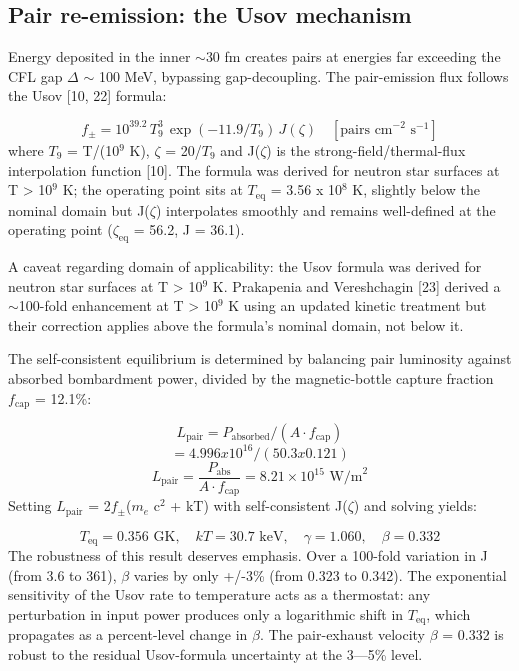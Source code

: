\documentclass[12pt,a4paper]{article}
\begin{document}
\subsection{Pair re-emission: the Usov mechanism}
Energy deposited in the inner $\sim$30 fm creates pairs at energies far exceeding the CFL gap $\Delta$ $\sim$ 100 MeV, bypassing gap-decoupling. The pair-emission flux follows the Usov [10, 22] formula:

\begin{equation}
f_{\pm} = 10^{39.2} \, T_9^3 \, \exp(-11.9/T_9) \, J(\zeta) \quad [\text{pairs cm}^{-2} \text{ s}^{-1}]
\end{equation}
where $T_9$ = T/(10$^{9}$ K), $\zeta$ = 20/$T_9$ and J($\zeta$) is the strong-field/thermal-flux interpolation function [10]. The formula was derived for neutron star surfaces at T > 10$^{9}$ K; the operating point sits at $T_{\text{eq}}$ = 3.56 x 10$^{8}$ K, slightly below the nominal domain but J($\zeta$) interpolates smoothly and remains well-defined at the operating point ($\zeta_{\text{eq}}$ = 56.2, J = 36.1).

A caveat regarding domain of applicability: the Usov formula was derived for neutron star surfaces at T > 10$^{9}$ K. Prakapenia and Vereshchagin [23] derived a $\sim$100-fold enhancement at T > 10$^{9}$ K using an updated kinetic treatment but their correction applies above the formula's nominal domain, not below it.

The self-consistent equilibrium is determined by balancing pair luminosity against absorbed bombardment power, divided by the magnetic-bottle capture fraction $f_{\text{cap}}$ = 12.1\%:

\[
L_{\text{pair}} = P_{\text{absorbed}}/(A \cdot f_{\text{cap}})
\]
\[
= 4.996 x 10^{16}/(50.3 x 0.121)
\]
\begin{equation}
L_\text{pair} = \frac{P_\text{abs}}{A \cdot f_\text{cap}} = 8.21 \times 10^{15} \text{ W/m}^2
\end{equation}
Setting $L_{\text{pair}}$ = 2$f_{±}$($m_e$ c$^{2}$ + kT) with self-consistent J($\zeta$) and solving yields:

\begin{equation}
T_\text{eq} = 0.356 \text{ GK}, \quad kT = 30.7 \text{ keV}, \quad \gamma = 1.060, \quad \beta = 0.332
\end{equation}
The robustness of this result deserves emphasis. Over a 100-fold variation in J (from 3.6 to 361), $\beta$ varies by only +/-3\% (from 0.323 to 0.342). The exponential sensitivity of the Usov rate to temperature acts as a thermostat: any perturbation in input power produces only a logarithmic shift in $T_{\text{eq}}$, which propagates as a percent-level change in $\beta$. The pair-exhaust velocity $\beta$ = 0.332 is robust to the residual Usov-formula uncertainty at the 3---5\% level.
\end{document}
